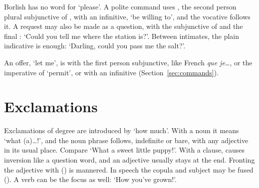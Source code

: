 Borlish has no word for `please'. A polite command uses , the second person plural subjunctive of , with an infinitive, `be willing to', and the vocative follows it.
A request may also be made as a question, with the subjunctive of  and the final :  `Could you tell me where the station is?'. Between intimates, the plain indicative  is enough:  `Darling, could you pass me the salt?'.

An offer, `let me', is  with the first person subjunctive, like French \textit{que je\ldots}, or the imperative of  `permit', or  with an infinitive (Section~\ref{sec:commands}).

\section{Exclamations}\label{sec:exclamatives}
Exclamations of degree are introduced by  `how much'. With a noun it means `what (a)\ldots!', and the noun phrase follows, indefinite or bare, with any adjective in its usual place.
Compare  `What a sweet little puppy!'. With a clause,  causes inversion like a question word, and an adjective usually stays at the end. Fronting the adjective with  () is mannered.
In speech the copula and subject may be fused (). A verb can be the focus as well:  `How you've grown!'.

